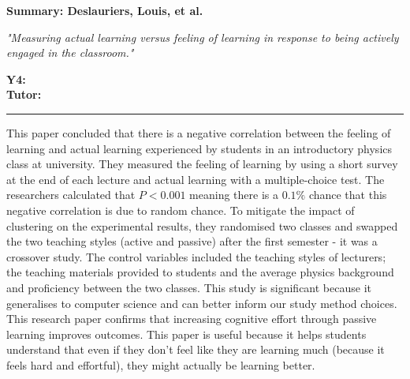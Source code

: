 






\begin{Large}
    \textbf{Summary: Deslauriers, Louis, et al.}\\
\end{Large}
\break{}
\begin{large}
    \textit{"Measuring actual learning versus feeling of learning in response to being actively engaged in the classroom."}
\end{large}


\vspace{1ex}

\textsf{\textbf{Y4:}} \\
\textsf{\textbf{Tutor:}} 


\vspace{1ex}
\hrule
\vspace{2ex}

\par This paper concluded that there is a negative correlation between the feeling of learning and actual learning experienced by students in an introductory physics class at university. They measured the feeling of learning by using a short survey at the end of each lecture and actual learning with a multiple-choice test. The researchers calculated that $P < 0.001$ meaning there is a $0.1\%$ chance that this negative correlation is due to random chance. To mitigate the impact of clustering on the experimental results, they randomised two classes and swapped the two teaching styles (active and passive) after the first semester - it was a crossover study. The control variables included the teaching styles of lecturers; the teaching materials provided to students and the average physics background and proficiency between the two classes. This study is significant because it generalises to computer science and can better inform our study method choices. This research paper confirms that increasing cognitive effort through passive learning improves outcomes. This paper is useful because it helps students understand that even if they don't feel like they are learning much (because it feels hard and effortful), they might actually be learning better.





